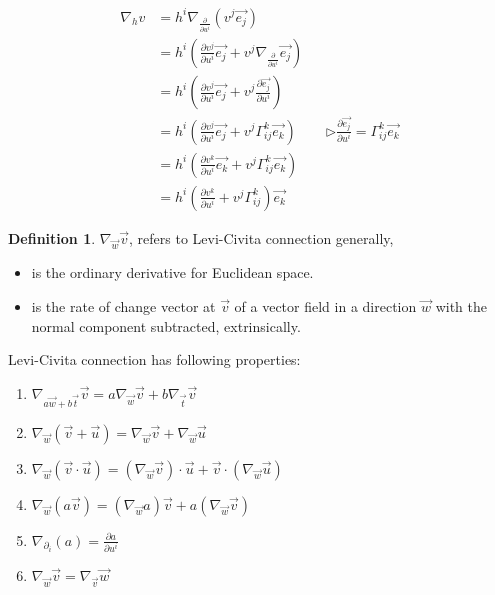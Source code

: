 \documentclass[a4paper]{article}
\theoremstyle{definition}
\newtheorem{definition}{Definition}
\theoremstyle{plain}
\begin{document}
\begin{align*}
    \nabla_hv&=h^i\nabla_{\frac{\partial}{\partial u^i}}(v^j \vec{e_j})\\
    &=h^i\left(\frac{\partial v^j}{\partial u^i}\vec{e_j}+v^j\nabla_{\frac{\partial}{\partial u^i}}\vec{e_j}\right)\\
    &=h^i\left(\frac{\partial v^j}{\partial u^i}\vec{e_j}+v^j\frac{\partial \vec{e_j}}{\partial u^i}\right)\\
    &=h^i\left(\frac{\partial v^j}{\partial u^i}\vec{e_j}+v^j\Gamma^k_{ij}\vec{e_k}\right) && \triangleright  \frac{\partial\vec{e_j}}{\partial u^i}=\Gamma^k_{ij}\vec{e_k}\\
    &=h^i\left(\frac{\partial v^k}{\partial u^i}\vec{e_k}+v^j\Gamma^k_{ij}\vec{e_k}\right)\\
    &=h^i\left(\frac{\partial v^k}{\partial u^i}+v^j\Gamma^k_{ij}\right)\vec{e_k}
\end{align*}

\begin{definition}
 $\nabla_{\vec{w}}\vec{v}$, refers to Levi-Civita connection generally,
\begin{itemize}
    \item is the ordinary derivative for Euclidean space.
    \item is the rate of change vector at $\Vec{v}$ of a vector field in a direction $\Vec{w}$ with the normal component subtracted, extrinsically.
\end{itemize}

Levi-Civita connection has following properties:
\begin{enumerate}
    \item $\nabla_{a\vec{w}+b\vec{t}}\vec{v}=a\nabla_{\vec{w}}\vec{v}+b\nabla_{\vec{t}}\vec{v}$
    \item $\nabla_{\vec{w}}(\vec{v}+\vec{u})=\nabla_{\vec{w}}\vec{v}+\nabla_{\vec{w}}\vec{u}$
    \item $\nabla_{\vec{w}}(\vec{v}\cdot\vec{u})=(\nabla_{\vec{w}}\vec{v})\cdot\vec{u}+\vec{v}\cdot(\nabla_{\vec{w}}\vec{u})$
    \item $\nabla_{\vec{w}}(a\vec{v})=(\nabla_{\vec{w}}a)\vec{v}+a(\nabla_{\vec{w}}\vec{v})$
    \item $\nabla_{\partial_i}(a)=\frac{\partial a}{\partial u^i}$
    \item $\nabla_{\vec{w}}\vec{v}=\nabla_{\vec{v}}\vec{w}$
\end{enumerate}
\end{definition}
\end{document}
